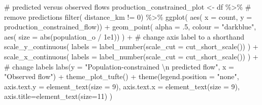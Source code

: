\documentclass[
  a4paper, 
  twoside,
  final
]{article}
\newenvironment{Shaded}{\begin{snugshade}}{\end{snugshade}}
\newcommand{\AttributeTok}[1]{\textcolor[rgb]{0.40,0.45,0.13}{#1}}
\newcommand{\CommentTok}[1]{\textcolor[rgb]{0.37,0.37,0.37}{#1}}
\newcommand{\DecValTok}[1]{\textcolor[rgb]{0.68,0.00,0.00}{#1}}
\newcommand{\FloatTok}[1]{\textcolor[rgb]{0.68,0.00,0.00}{#1}}
\newcommand{\FunctionTok}[1]{\textcolor[rgb]{0.28,0.35,0.67}{#1}}
\newcommand{\NormalTok}[1]{\textcolor[rgb]{0.00,0.23,0.31}{#1}}
\newcommand{\OtherTok}[1]{\textcolor[rgb]{0.00,0.23,0.31}{#1}}
\newcommand{\SpecialCharTok}[1]{\textcolor[rgb]{0.37,0.37,0.37}{#1}}
\newcommand{\StringTok}[1]{\textcolor[rgb]{0.13,0.47,0.30}{#1}}
\begin{document}
\begin{Shaded}
\begin{Highlighting}[]
\CommentTok{\# predicted versus observed flows}
\NormalTok{production\_constrained\_plot }\OtherTok{\textless{}{-}}\NormalTok{ df }\SpecialCharTok{\%\textgreater{}\%} 
  \CommentTok{\# remove predictions}
  \FunctionTok{filter}\NormalTok{( distance\_km }\SpecialCharTok{!=} \DecValTok{0}\NormalTok{) }\SpecialCharTok{\%\textgreater{}\%} 
  \FunctionTok{ggplot}\NormalTok{( }\FunctionTok{aes}\NormalTok{( }\AttributeTok{x =}\NormalTok{ count, }\AttributeTok{y =}\NormalTok{ production\_constrained\_flow)) }\SpecialCharTok{+}
  \FunctionTok{geom\_point}\NormalTok{( }\AttributeTok{alpha =}\NormalTok{ .}\DecValTok{5}\NormalTok{, }\AttributeTok{colour =} \StringTok{"darkblue"}\NormalTok{,}
              \FunctionTok{aes}\NormalTok{( }\AttributeTok{size =} \FunctionTok{abs}\NormalTok{(population\_o }\SpecialCharTok{/} \FloatTok{1e1}\NormalTok{)) ) }\SpecialCharTok{+}
  \CommentTok{\# change axis label to a shorthand}
  \FunctionTok{scale\_y\_continuous}\NormalTok{(}
    \AttributeTok{labels =} \FunctionTok{label\_number}\NormalTok{(}\AttributeTok{scale\_cut =} \FunctionTok{cut\_short\_scale}\NormalTok{())}
\NormalTok{    ) }\SpecialCharTok{+} 
  \FunctionTok{scale\_x\_continuous}\NormalTok{(}
    \AttributeTok{labels =} \FunctionTok{label\_number}\NormalTok{(}\AttributeTok{scale\_cut =} \FunctionTok{cut\_short\_scale}\NormalTok{())}
\NormalTok{    ) }\SpecialCharTok{+} 
  \CommentTok{\# change labels}
  \FunctionTok{labs}\NormalTok{(}\AttributeTok{y =} \StringTok{"Population{-}constrained }\SpecialCharTok{\textbackslash{}n}\StringTok{ predicted flow"}\NormalTok{,}
       \AttributeTok{x =} \StringTok{"Observed flow"}\NormalTok{) }\SpecialCharTok{+}
  \FunctionTok{theme\_plot\_tufte}\NormalTok{() }\SpecialCharTok{+}
  \FunctionTok{theme}\NormalTok{(}\AttributeTok{legend.position =} \StringTok{"none"}\NormalTok{,}
        \AttributeTok{axis.text.y =} \FunctionTok{element\_text}\NormalTok{(}\AttributeTok{size =} \DecValTok{9}\NormalTok{),}
        \AttributeTok{axis.text.x =} \FunctionTok{element\_text}\NormalTok{(}\AttributeTok{size =} \DecValTok{9}\NormalTok{),}
        \AttributeTok{axis.title=}\FunctionTok{element\_text}\NormalTok{(}\AttributeTok{size=}\DecValTok{11}\NormalTok{)}
\NormalTok{        )}


\end{Highlighting}
\end{Shaded}
\end{document}

